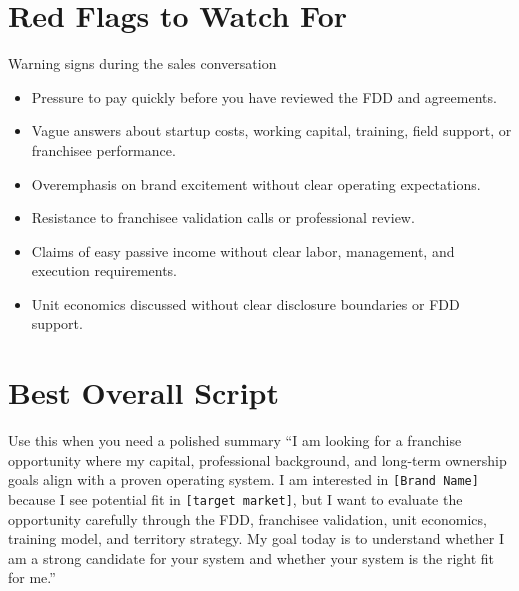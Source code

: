 \documentclass[11pt]{article}
\newcommand{\placeholder}[1]{\textcolor{accent}{\texttt{[#1]}}}
\begin{document}
\section{Red Flags to Watch For}

\begin{warningbox}{Warning signs during the sales conversation}
\begin{itemize}
  \item Pressure to pay quickly before you have reviewed the FDD and agreements.
  \item Vague answers about startup costs, working capital, training, field support, or franchisee performance.
  \item Overemphasis on brand excitement without clear operating expectations.
  \item Resistance to franchisee validation calls or professional review.
  \item Claims of easy passive income without clear labor, management, and execution requirements.
  \item Unit economics discussed without clear disclosure boundaries or FDD support.
\end{itemize}
\end{warningbox}

\section{Best Overall Script}

\begin{keybox}{Use this when you need a polished summary}
``I am looking for a franchise opportunity where my capital, professional background, and long-term ownership goals align with a proven operating system. I am interested in \placeholder{Brand Name} because I see potential fit in \placeholder{target market}, but I want to evaluate the opportunity carefully through the FDD, franchisee validation, unit economics, training model, and territory strategy. My goal today is to understand whether I am a strong candidate for your system and whether your system is the right fit for me.''
\end{keybox}
\end{document}
